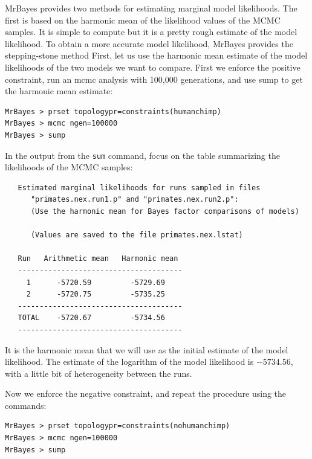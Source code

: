 \documentclass[12pt]{book}
\newcommand{\ttt}[1]{\texttt{#1}}
\begin{document}
MrBayes provides two methods for estimating marginal model likelihoods. The first is based on the
harmonic mean of the likelihood values of the MCMC samples. It is simple to compute but it is a
pretty rough estimate of the model likelihood. To obtain a more accurate model likelihood, MrBayes
provides the stepping-stone method First, let us use the harmonic mean estimate of the model
likelihoods of the two models we want to compare. First we enforce the positive constraint, run an
mcmc analysis with 100,000 generations, and use sump to get the harmonic mean estimate:

\begin{singlespacing}
\begin{verbatim}
MrBayes > prset topologypr=constraints(humanchimp)
MrBayes > mcmc ngen=100000
MrBayes > sump
\end{verbatim}
\end{singlespacing}

In the output from the \ttt{sum} command, focus on the table summarizing the likelihoods of the
MCMC samples:

\begin{singlespacing}
\footnotesize
\begin{verbatim}
   Estimated marginal likelihoods for runs sampled in files
      "primates.nex.run1.p" and "primates.nex.run2.p":
      (Use the harmonic mean for Bayes factor comparisons of models)

      (Values are saved to the file primates.nex.lstat)

   Run   Arithmetic mean   Harmonic mean
   --------------------------------------
     1      -5720.59         -5729.69
     2      -5720.75         -5735.25
   --------------------------------------
   TOTAL    -5720.67         -5734.56
   --------------------------------------
\end{verbatim}
\end{singlespacing}
\normalsize

It is the harmonic mean that we will use as the initial estimate of the model likelihood. The
estimate of the logarithm of the model likelihood is $-5734.56$, with a little bit of heterogeneity
between the runs.

Now we enforce the negative constraint, and repeat the procedure using the commands:

\begin{singlespacing}
\begin{verbatim}
MrBayes > prset topologypr=constraints(nohumanchimp)
MrBayes > mcmc ngen=100000
MrBayes > sump
\end{verbatim}
\end{singlespacing}
\end{document}
